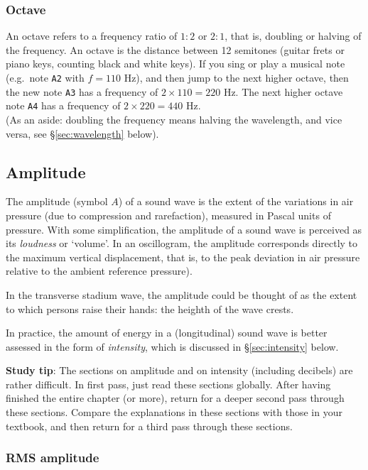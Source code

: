 \documentclass[
]{book}
\begin{document}
\subsubsection{Octave}\label{sec:octave}

An octave refers to a frequency ratio of \(1:2\) or \(2:1\), that is, doubling or halving of the frequency. An octave is the distance between 12 semitones (guitar frets or piano keys, counting black and white keys). If you sing or play a musical note (e.g.~note \texttt{A2} with \(f=110\) Hz), and then jump to the next higher octave, then the new note \texttt{A3} has a frequency of \(2 \times 110=220\) Hz. The next higher octave note \texttt{A4} has a frequency of \(2 \times 220=440\) Hz.\\
(As an aside: doubling the frequency means halving the wavelength, and vice versa, see §\ref{sec:wavelength} below).

\subsection{Amplitude}\label{sec:amplitude}

The amplitude (symbol \(A\)) of a sound wave is the extent of the variations in air pressure (due to compression and rarefaction), measured in Pascal units of pressure. With some simplification, the amplitude of a sound wave is perceived as its \emph{loudness} or `volume'. In an oscillogram, the amplitude corresponds directly to the maximum vertical displacement, that is, to the peak deviation in air pressure relative to the ambient reference pressure).

In the transverse stadium wave, the amplitude could be thought of as the extent to which persons raise their hands: the heighth of the wave crests.

In practice, the amount of energy in a (longitudinal) sound wave is better assessed in the form of \emph{intensity}, which is discussed in §\ref{sec:intensity} below.

\textbf{Study tip}: The sections on amplitude and on intensity (including decibels) are rather difficult. In first pass, just read these sections globally. After having finished the entire chapter (or more), return for a deeper second pass through these sections. Compare the explanations in these sections with those in your textbook, and then return for a third pass through these sections.

\subsubsection{RMS amplitude}\label{rms-amplitude}
\end{document}
